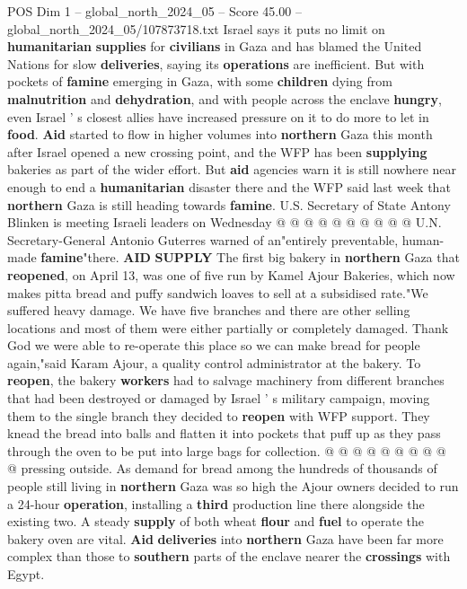 \begin{textsample}{POS Dim 1 – global\_north\_2024\_05 – Score 45.00 – global\_north\_2024\_05/107873718.txt}
Israel says it puts no limit on \textbf{humanitarian} \textbf{supplies} for \textbf{civilians} in Gaza and has blamed the United Nations for slow \textbf{deliveries}, saying its \textbf{operations} are inefficient.
But with pockets of \textbf{famine} emerging in Gaza, with some \textbf{children} dying from \textbf{malnutrition} and \textbf{dehydration}, and with people across the enclave \textbf{hungry}, even Israel ' s closest allies have increased pressure on it to do more to let in \textbf{food}. \textbf{Aid} started to flow in higher volumes into \textbf{northern} Gaza this month after Israel opened a new crossing point, and the WFP has been \textbf{supplying} bakeries as part of the wider effort.
But \textbf{aid} agencies warn it is still nowhere near enough to end a \textbf{humanitarian} disaster there and the WFP said last week that \textbf{northern} Gaza is still heading towards \textbf{famine}.
U.S.
Secretary of State Antony Blinken is meeting Israeli leaders on Wednesday @ @ @ @ @ @ @ @ @ @ U.N.
Secretary-General Antonio Guterres warned of an"entirely preventable, human-made \textbf{famine}"there. \textbf{AID} \textbf{SUPPLY} The first big bakery in \textbf{northern} Gaza that \textbf{reopened}, on April 13, was one of five run by Kamel Ajour Bakeries, which now makes pitta bread and puffy sandwich loaves to sell at a subsidised rate."We suffered heavy damage.
We have five branches and there are other selling locations and most of them were either partially or completely damaged.
Thank God we were able to re-operate this place so we can make bread for people again,"said Karam Ajour, a quality control administrator at the bakery.
To \textbf{reopen}, the bakery \textbf{workers} had to salvage machinery from different branches that had been destroyed or damaged by Israel ' s military campaign, moving them to the single branch they decided to \textbf{reopen} with WFP support.
They knead the bread into balls and flatten it into pockets that puff up as they pass through the oven to be put into large bags for collection. @ @ @ @ @ @ @ @ @ @ pressing outside.
As demand for bread among the hundreds of thousands of people still living in \textbf{northern} Gaza was so high the Ajour owners decided to run a 24-hour \textbf{operation}, installing a \textbf{third} production line there alongside the existing two.
A steady \textbf{supply} of both wheat \textbf{flour} and \textbf{fuel} to operate the bakery oven are vital. \textbf{Aid} \textbf{deliveries} into \textbf{northern} Gaza have been far more complex than those to \textbf{southern} parts of the enclave nearer the \textbf{crossings} with Egypt.

\end{textsample}
